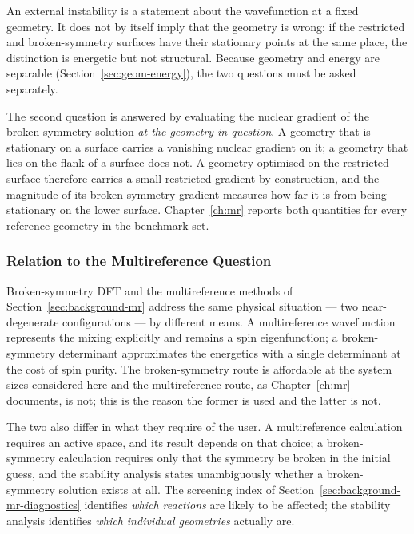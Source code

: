 An external instability is a statement about the wavefunction at a fixed
geometry. It does not by itself imply that the geometry is wrong: if the
restricted and broken-symmetry surfaces have their stationary points at the same
place, the distinction is energetic but not structural. Because geometry and
energy are separable (Section~\ref{sec:geom-energy}), the two questions must be
asked separately.

The second question is answered by evaluating the nuclear gradient of the
broken-symmetry solution \emph{at the geometry in question}. A geometry that is
stationary on a surface carries a vanishing nuclear gradient on it; a geometry
that lies on the flank of a surface does not. A geometry optimised on the
restricted surface therefore carries a small restricted gradient by construction,
and the magnitude of its broken-symmetry gradient measures how far it is from
being stationary on the lower surface. Chapter~\ref{ch:mr} reports both
quantities for every reference geometry in the benchmark set.

\subsubsection{Relation to the Multireference Question}

Broken-symmetry DFT and the multireference methods of
Section~\ref{sec:background-mr} address the same physical situation --- two
near-degenerate configurations --- by different means. A multireference
wavefunction represents the mixing explicitly and remains a spin eigenfunction; a
broken-symmetry determinant approximates the energetics with a single
determinant at the cost of spin purity. The broken-symmetry route is affordable
at the system sizes considered here and the multireference route, as
Chapter~\ref{ch:mr} documents, is not; this is the reason the former is
used and the latter is not.

The two also differ in what they require of the user. A multireference
calculation requires an active space, and its result depends on that choice; a
broken-symmetry calculation requires only that the symmetry be broken in the
initial guess, and the stability analysis states unambiguously whether a
broken-symmetry solution exists at all. The screening index of
Section~\ref{sec:background-mr-diagnostics} identifies \emph{which reactions} are
likely to be affected; the stability analysis identifies \emph{which individual
geometries} actually are.

